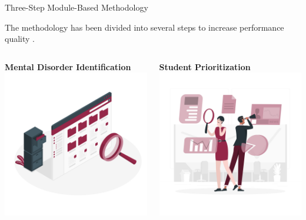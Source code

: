 \documentclass[10pt, xcolor=table]{beamer}
\begin{document}
\begin{frame}{Three-Step Module-Based Methodology}
	
	The methodology has been divided into several steps to increase performance quality \cite{DEHGHANBONARI2023100238}.
	\vspace{0.5cm}
	
	\begin{columns}[c]
		\centering
		\textbf{Mental Disorder Identification} \\
		\includegraphics[width=\linewidth]{./figures/identification.png}
		
		\centering
		\textbf{Student Prioritization} \\
		\includegraphics[width=\linewidth]{./figures/priorizing.png}
		

\end{columns}
\end{frame}
\end{document}
